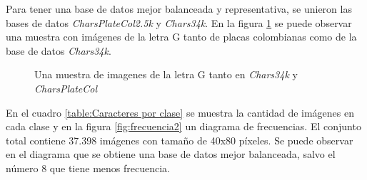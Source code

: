 Para tener una base de datos mejor balanceada y representativa, se unieron las bases de datos \textit{CharsPlateCol2.5k} y \textit{Chars34k}. En la figura \ref{fig:Muestra de dataset chars34K} se puede observar una muestra con imágenes de la letra G tanto de placas colombianas como de la base de datos \textit{Chars34k}. 
\begin{figure}[H]
\begin{center}
    \caption{Una muestra de imagenes de la letra G tanto en \textit{Chars34k} y \textit{CharsPlateCol}}
    \label{fig:Muestra de dataset chars34K} 
\end{center}
\end{figure}

En el cuadro \ref{table:Caracteres por clase} se muestra la cantidad de imágenes en cada clase y en la figura \ref{fig:frecuencia2} un diagrama de frecuencias. El conjunto total contiene 37.398 imágenes con tamaño de 40x80 píxeles. Se puede observar en el diagrama que se obtiene una base de datos mejor balanceada, salvo el número 8 que tiene menos frecuencia.


